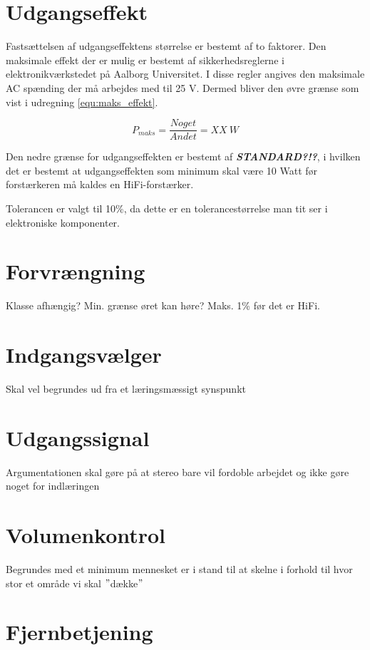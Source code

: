 \section{Udgangseffekt}
\label{krav_udgangseffekt}
Fastsættelsen af udgangseffektens størrelse er bestemt af to faktorer. Den maksimale effekt der er mulig er bestemt af sikkerhedsreglerne i elektronikværkstedet på Aalborg Universitet. I disse regler angives den maksimale AC spænding der må arbejdes med til 25 V. Dermed bliver den øvre grænse som vist i udregning \ref{equ:maks_effekt}.

\begin{equation}
\label{equ:maks_effekt}
P_{maks} = \frac{Noget}{Andet} = XX~W
\end{equation}

Den nedre grænse for udgangseffekten er bestemt af \textbf{\textit{STANDARD?!?}}, i hvilken det er bestemt at udgangseffekten som minimum skal være 10 Watt før forstærkeren må kaldes en HiFi-forstærker.

Tolerancen er valgt til 10\%, da dette er en tolerancestørrelse man tit ser i elektroniske komponenter.

\section{Forvrængning}
\label{krav_forvraengning}
Klasse afhængig? Min. grænse øret kan høre? Maks. 1\% før det er HiFi.

\section{Indgangsvælger}
\label{krav_indgangsvaelger}
Skal vel begrundes ud fra et læringsmæssigt synspunkt

\section{Udgangssignal}
\label{krav_udgangssignal}
Argumentationen skal gøre på at stereo bare vil fordoble arbejdet og ikke gøre noget for indlæringen

\section{Volumenkontrol}
\label{krav_volumenkontrol}
Begrundes med et minimum mennesket er i stand til at skelne i forhold til hvor stor et område vi skal $"$dække$"$

\section{Fjernbetjening}
\label{krav_fjernbetjening}
